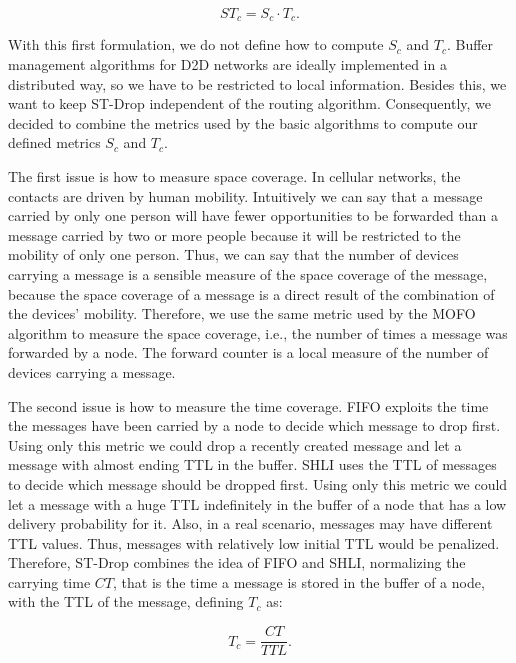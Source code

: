 \begin{equation}
    ST_{c} = S_{c} \cdot T_{c}.
\end{equation}

With this first formulation, we do not define how to compute $S_c$ and $T_c$. Buffer management algorithms for D2D networks are ideally implemented in a distributed way, so we have to be restricted to local information. Besides this, we want to keep ST-Drop independent of the routing algorithm. Consequently, we decided to combine the metrics used by the basic algorithms to compute our defined metrics $S_c$ and $T_c$.

The first issue is how to measure space coverage. In cellular networks, the contacts are driven by human mobility. Intuitively we can say that a message carried by only one person will have fewer opportunities to be forwarded than a message carried by two or more people because it will be restricted to the mobility of only one person. Thus, we can say that the
number of devices carrying a message is a sensible measure of the space coverage of the message, because the space coverage of a message is a direct result of the combination of the devices' mobility. Therefore, we use the same metric used by the MOFO algorithm to measure the space coverage, i.e., the number of times a message was forwarded by a node.
The forward counter is a local measure of the number of devices carrying a message.

The second issue is how to measure the time coverage. FIFO exploits the time the messages have been carried by a node to decide which message to drop first. Using only this metric we could drop a recently created message and let a message with almost ending TTL in the buffer. SHLI uses the TTL of messages to decide which message should be dropped first. Using only this metric we could let a message with a huge TTL indefinitely in the buffer of a node that has a low delivery probability for it. Also, in a real scenario, messages may have different TTL values. Thus, messages with relatively low initial TTL would be penalized. Therefore,
ST-Drop combines the idea of FIFO and SHLI, normalizing the carrying time $CT$, that is the time a message is stored in the buffer of a node, with the TTL of the message, defining $T_{c}$ as:

\begin{equation}
    T_{c} = \frac{CT}{TTL}.
\end{equation}

